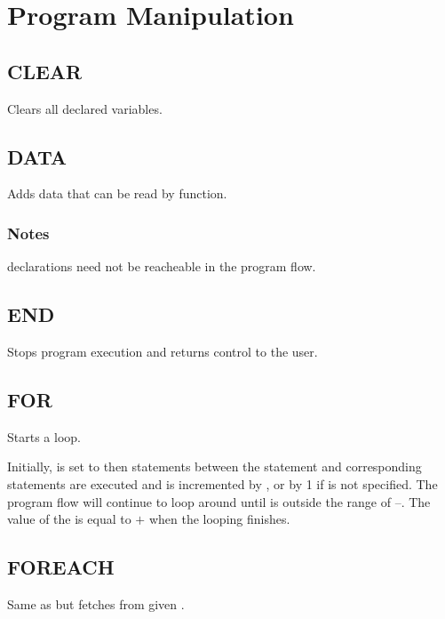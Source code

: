 \section{Program Manipulation}

    \subsection{CLEAR}
        \par
        Clears all declared variables.
    \subsection{DATA}
        \par
        Adds data that can be read by  function.
        \subsubsection*{Notes}
        \begin{itemlist}
        \item {} declarations need not be reacheable in the program flow.
        \end{itemlist}
    \subsection{END}
        \par
        Stops program execution and returns control to the user.
    \subsection{FOR}
        \par
        Starts a  loop.\par
        Initially,  is set to  then statements between the  statement and corresponding  statements are executed and  is incremented by , or by 1 if  is not specified. The program flow will continue to loop around until  is outside the range of --. The value of the  is equal to $+$ when the looping finishes.
    \subsection{FOREACH}
        \par
        Same as  but fetches  from given .

